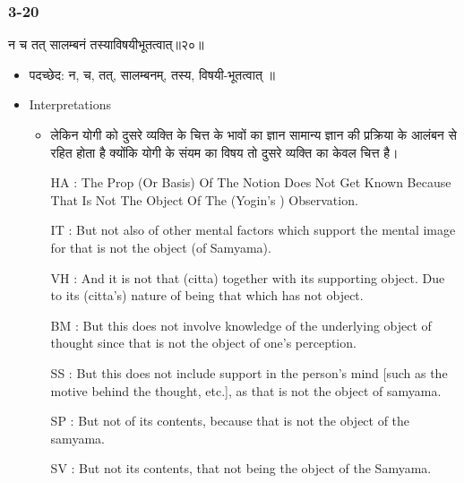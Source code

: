 \begin{frame}[fragile]\frametitle{3-20}
\begin{sanskrit}
न च तत् सालम्बनं तस्याविषयीभूतत्वात्॥२०॥
\end{sanskrit}

	\begin{itemize}
	\item पदच्छेद:  न, च, तत्, सालम्बनम्, तस्य, विषयी-भूतत्वात् ॥
	\item Interpretations
		\begin{itemize}	
		\item लेकिन योगी को दुसरे व्यक्ति के चित्त के भावों का ज्ञान सामान्य ज्ञान की प्रक्रिया के आलंबन से रहित होता है क्योंकि योगी के संयम का विषय तो दुसरे व्यक्ति का केवल चित्त है।
		\item [HA]: The Prop (Or Basis) Of The Notion Does Not Get Known Because That Is Not The Object Of The (Yogin’s ) Observation.
		\item [IT]: But not also of other mental factors which support the mental image for that is not the object (of Samyama).
		\item [VH]: And it is not that (citta) together with its supporting object. Due to its (citta’s) nature of being that which has not object.
		\item [BM]: But this does not involve knowledge of the underlying object of thought since that is not the object of one’s perception.
		\item [SS]: But this does not include support in the person’s mind [such as the motive behind the thought, etc.], as that is not the object of samyama.
		\item [SP]: But not of its contents, because that is not the object of the samyama.
		\item [SV]: But not its contents, that not being the object of the Samyama. 
		\end{itemize}
	\end{itemize}
\end{frame}

